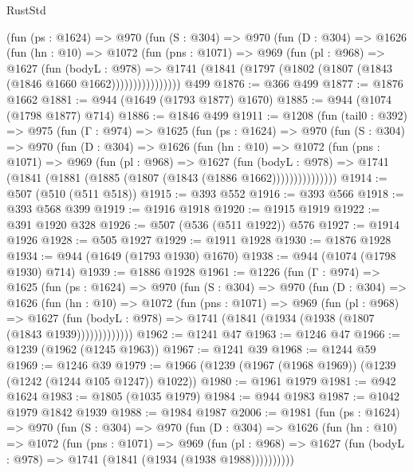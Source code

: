 \begin{lexlean}{RustStd}
\begin{coremodule}
          (fun (ps : @1624) =>
          @970
            (fun (S : @304) =>
            @970
              (fun (D : @304) =>
              @1626
                (fun (hn : @10) =>
                @1072
                  (fun (pns : @1071) =>
                  @969
                    (fun (pl : @968) =>
                    @1627
                      (fun (bodyL : @978) =>
                      @1741 (@1841 (@1797 (@1802 (@1807 (@1843 (@1846 @1660 @1662))))))))))))))))
    @499
@1876 := @366 @499
@1877 := @1876 @1662
@1881 := @944 (@1649 (@1793 @1877) @1670)
@1885 := @944 (@1074 (@1798 @1877) @714)
@1886 := @1846 @499
@1911 := @1208
    (fun (tail0 : @392) =>
    @975
      (fun (Γ : @974) =>
      @1625
        (fun (ps : @1624) =>
        @970
          (fun (S : @304) =>
          @970
            (fun (D : @304) =>
            @1626
              (fun (hn : @10) =>
              @1072
                (fun (pns : @1071) =>
                @969
                  (fun (pl : @968) =>
                  @1627
                    (fun (bodyL : @978) =>
                    @1741 (@1841 (@1881 (@1885 (@1807 (@1843 (@1886 @1662)))))))))))))))
@1914 := @507 (@510 (@511 @518))
@1915 := @393 @552
@1916 := @393 @566
@1918 := @393 @568 @399
@1919 := @1916 @1918
@1920 := @1915 @1919
@1922 := @391 @1920 @328
@1926 := @507 (@536 (@511 @1922)) @576
@1927 := @1914 @1926
@1928 := @505 @1927
@1929 := @1911 @1928
@1930 := @1876 @1928
@1934 := @944 (@1649 (@1793 @1930) @1670)
@1938 := @944 (@1074 (@1798 @1930) @714)
@1939 := @1886 @1928
@1961 := @1226
    (fun (Γ : @974) =>
    @1625
      (fun (ps : @1624) =>
      @970
        (fun (S : @304) =>
        @970
          (fun (D : @304) =>
          @1626
            (fun (hn : @10) =>
            @1072
              (fun (pns : @1071) =>
              @969
                (fun (pl : @968) =>
                @1627
                  (fun (bodyL : @978) => @1741 (@1841 (@1934 (@1938 (@1807 (@1843 @1939)))))))))))))
@1962 := @1241 @47
@1963 := @1246 @47
@1966 := @1239 (@1962 (@1245 @1963))
@1967 := @1241 @39
@1968 := @1244 @59
@1969 := @1246 @39
@1979 := @1966 (@1239 (@1967 (@1968 @1969)) (@1239 (@1242 (@1244 @105 @1247)) @1022))
@1980 := @1961 @1979
@1981 := @942 @1624
@1983 := @1805 (@1035 @1979)
@1984 := @944 @1983
@1987 := @1042 @1979 @1842 @1939
@1988 := @1984 @1987
@2006 := @1981
    (fun (ps : @1624) =>
    @970
      (fun (S : @304) =>
      @970
        (fun (D : @304) =>
        @1626
          (fun (hn : @10) =>
          @1072
            (fun (pns : @1071) =>
            @969
              (fun (pl : @968) =>
              @1627 (fun (bodyL : @978) => @1741 (@1841 (@1934 (@1938 @1988))))))))))

\end{coremodule}
\end{lexlean}
